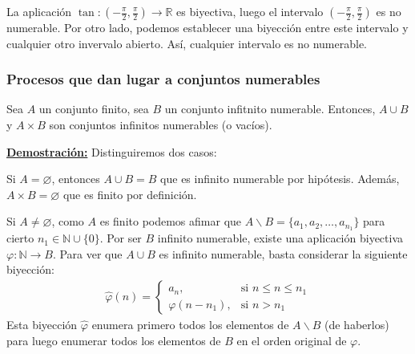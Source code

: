 \documentclass[12pt,a4paper]{article}
\newcommand{\R}{\mathbb{R}}
\newcommand{\N}{\mathbb{N}}
\newcommand{\dem}{
    \noindent \underline{\textbf{Demostración:}}
}
\begin{document}
\vspace{6mm}
La aplicación $\tan : (-\frac{\pi}{2}, \frac{\pi}{2}) \longrightarrow \R$ es biyectiva, luego el intervalo
$(-\frac{\pi}{2}, \frac{\pi}{2})$ es no numerable. Por otro lado, podemos establecer una biyección entre
este intervalo y cualquier otro invervalo abierto. Así, cualquier intervalo es no numerable.

\subsubsection{Procesos que dan lugar a conjuntos numerables}
\hspace{3mm}
Sea $A$ un conjunto finito, sea $B$ un conjunto infitnito numerable. Entonces,
$A \cup B$ y $A \times B$ son conjuntos infinitos numerables (o vacíos).

\vspace{4mm}
\dem Distinguiremos dos casos:

\vspace{2mm}
Si $A = \varnothing$, entonces $A \cup B = B$ que es infinito numerable por hipótesis.
Además, $A \times B = \varnothing$ que es finito por definición.

\vspace{4mm}
Si $A \neq \varnothing$, como $A$ es finito podemos afimar que $A\backslash B = \{a_1, a_2, \ldots, a_{n_1}\}$
para cierto $n_1 \in \N \cup \{0\}$. Por ser $B$ infinito numerable, existe una aplicación biyectiva $\varphi : \N \to B$.
Para ver que $A \cup B$ es infinito numerable, basta considerar la siguiente biyección:
\begin{align*}
    \hat{\varphi} (n) = \begin{cases}
    a_n, & \text{si } n \leq n \leq n_1 \\
    \varphi(n - n_1), & \text{si } n > n_1
    \end{cases}
\end{align*}
Esta biyección $\hat{\varphi}$ enumera primero todos los elementos de $A \backslash B$ (de haberlos)
para luego enumerar todos los elementos de $B$ en el orden original de $\varphi$.
\end{document}
